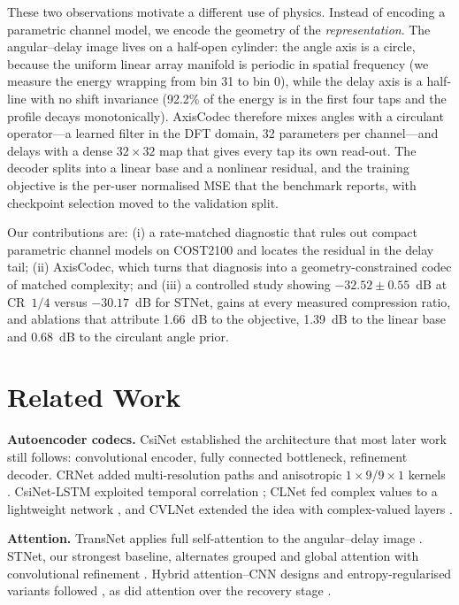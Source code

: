 \documentclass[journal]{IEEEtran}
\begin{document}
These two observations motivate a different use of physics. Instead of encoding a
parametric channel model, we encode the geometry of the \emph{representation}.
The angular--delay image lives on a half-open cylinder: the angle axis is a circle,
because the uniform linear array manifold is periodic in spatial frequency (we
measure the energy wrapping from bin 31 to bin 0), while the delay axis is a
half-line with no shift invariance (92.2\% of the energy is in the first four taps
and the profile decays monotonically). AxisCodec therefore mixes angles with a
circulant operator---a learned filter in the DFT domain, 32 parameters per
channel---and delays with a dense $32\times32$ map that gives every tap its own
read-out. The decoder splits into a linear base and a nonlinear residual, and the
training objective is the per-user normalised MSE that the benchmark reports,
with checkpoint selection moved to the validation split.

Our contributions are: (i) a rate-matched diagnostic that rules out compact
parametric channel models on COST2100 and locates the residual in the delay tail;
(ii) AxisCodec, which turns that diagnosis into a geometry-constrained codec of
matched complexity; and (iii) a controlled study showing $-32.52\pm0.55$~dB at
CR~$1/4$ versus $-30.17$~dB for STNet, gains at every measured compression ratio,
and ablations that attribute 1.66~dB to the objective, 1.39~dB to the linear base
and 0.68~dB to the circulant angle prior.

\section{Related Work}
\textbf{Autoencoder codecs.} CsiNet \cite{wen2018} established the architecture
that most later work still follows: convolutional encoder, fully connected
bottleneck, refinement decoder. CRNet added multi-resolution paths and anisotropic
$1\times9$/$9\times1$ kernels \cite{lu2020}. CsiNet-LSTM exploited temporal
correlation \cite{wang2019}; CLNet fed complex values to a lightweight network
\cite{ji2021}, and CVLNet extended the idea with complex-valued layers
\cite{cvl2022,trabelsi2018}.

\textbf{Attention.} TransNet applies full self-attention to the angular--delay
image \cite{cui2022}. STNet, our strongest baseline, alternates grouped and global
attention with convolutional refinement \cite{mourya2023}. Hybrid attention--CNN
designs and entropy-regularised variants followed \cite{lou2025,ansarifard2025},
as did attention over the recovery stage \cite{cai2019,saldr2021}.
\end{document}
